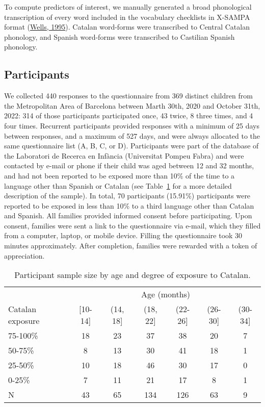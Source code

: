 \documentclass[
]{article}
\begin{document}
To compute predictors of interest, we manually generated a broad
phonological transcription of every word included in the vocabulary
checklists in X-SAMPA format
(\protect\hyperlink{ref-wells1995computercoding}{Wells, 1995}). Catalan
word-forms were transcribed to Central Catalan phonology, and Spanish
word-forms were transcribed to Castilian Spanish phonology.

\hypertarget{sec-participants}{%
\subsection{Participants}\label{sec-participants}}

We collected 440 responses to the questionnaire from 369 distinct
children from the Metropolitan Area of Barcelona between Marth 30th,
2020 and October 31th, 2022: 314 of those participants participated
once, 43 twice, 8 three times, and 4 four times. Recurrent participants
provided responses with a minimum of 25 days between responses, and a
maximum of 527 days, and were always allocated to the same questionnaire
list (A, B, C, or D). Participants were part of the database of the
Laboratori de Recerca en Infància (Universitat Pompeu Fabra) and were
contacted by e-mail or phone if their child was aged between 12 and 32
months, and had not been reported to be exposed more than 10\% of the
time to a language other than Spanish or Catalan (see
Table~\ref{tbl-participants} for a more detailed description of the
sample). In total, 70 participants (15.91\%) participants were reported
to be exposed in less than 10\% to a third language other than Catalan
and Spanish. All families provided informed consent before
participating. Upon consent, families were sent a link to the
questionnaire via e-mail, which they filled from a computer, laptop, or
mobile device. Filling the questionnaire took 30 minutes approximately.
After completion, families were rewarded with a token of appreciation.

\hypertarget{tbl-participants}{}
\begin{table}
\caption{\label{tbl-participants}Participant sample size by age and degree of exposure to Catalan. }\tabularnewline

\centering
\begin{tabular}{lcccccc}
\toprule
\multicolumn{1}{c}{ } & \multicolumn{6}{c}{Age (months)} \\
\cmidrule(l{3pt}r{3pt}){2-7}
Catalan exposure & {}[10-14] & (14, 18] & (18, 22] & (22-26] & (26-30] & (30-34]\\
\midrule
75-100\% & 18 & 23 & 37 & 38 & 20 & 7\\
50-75\% & 8 & 13 & 30 & 41 & 18 & 1\\
25-50\% & 10 & 18 & 46 & 30 & 17 & 0\\
0-25\% & 7 & 11 & 21 & 17 & 8 & 1\\
\midrule
N & 43 & 65 & 134 & 126 & 63 & 9\\
\bottomrule
\end{tabular}
\end{table}
\end{document}
